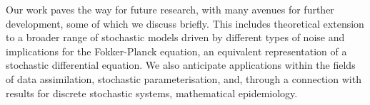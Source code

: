 Our work paves the way for future research, with many avenues for further development, some of which we discuss briefly.
This includes theoretical extension to a broader range of stochastic models driven by different types of noise and implications for the Fokker-Planck equation, an equivalent representation of a stochastic differential equation.
We also anticipate applications within the fields of data assimilation, stochastic parameterisation, and, through a connection with results for discrete stochastic systems, mathematical epidemiology.
